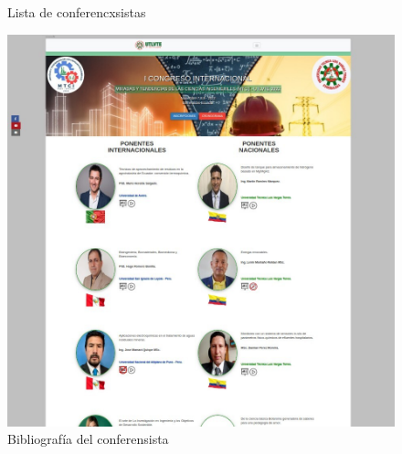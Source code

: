\documentclass[a4paper,14px]{article}
\begin{document}
\begin{minipage}[H]{0.5\linewidth}
\begin{figure}[H]
    \caption{Lista de conferencxsistas}
    \label{fig:conferensistas}
  \end{figure}
\end{minipage}
\hspace{0.5cm}
\begin{minipage}[H]{0.5\linewidth}
  \begin{figure}[H]
    \centering
    \includegraphics[scale=0.3]{ponentes.jpg}
    \caption{Bibliografía del conferensista}
    \label{fig:bibliografia}
  \end{figure}
\end{minipage}
\end{document}
